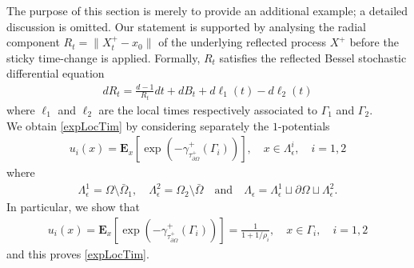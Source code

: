 \documentclass[10pt,a4paper]{article}
\numberwithin{equation}{section}
\theoremstyle{plain}
\theoremstyle{remark}
\begin{document}
The purpose of this section is merely to provide an additional example; a detailed discussion is omitted. Our statement is supported by analysing the radial component $R_t = \|X^+_t - x_0\|$ of the underlying reflected process $X^+$ before the sticky time-change is applied. Formally, $R_t$ satisfies the reflected Bessel stochastic differential equation
\begin{align*}
dR_{t}=\frac{d-1}{R_{t}}dt+dB_t + d\ell _{1}(t)-d\ell _{2}(t)
\end{align*}
where $\ell_1$ and $\ell_2$ are the local times respectively associated to $\Gamma_1$ and $\Gamma_2$. \\

We obtain \eqref{expLocTim} by considering separately the $1$-potentials
\begin{align*}
u_i(x) = \mathbf{E}_x[ \exp(-\gamma^+_{\tau^+_{\partial \Omega}}(\Gamma_i)) ], \quad x \in \Lambda_\epsilon^i, \quad i=1,2
\end{align*}
where
\begin{align*}
\Lambda_\epsilon^1 = \Omega \setminus \bar{\Omega}_1, \quad \Lambda_\epsilon^2 = \Omega_2 \setminus \bar{\Omega} \quad \textrm{and} \quad \Lambda_\epsilon = \Lambda_\epsilon^1 \sqcup \partial \Omega \sqcup \Lambda_\epsilon^2.
\end{align*}
In particular, we show that
\begin{align*}
u_i(x) = \mathbf{E}_x[ \exp(-\gamma^+_{\tau^+_{\partial \Omega}}(\Gamma_i)) ] = \frac{1}{1 + 1/\rho_i}, \quad x \in \Gamma_i, \quad i=1,2
\end{align*}
and this proves \eqref{expLocTim}.\\
\end{document}
